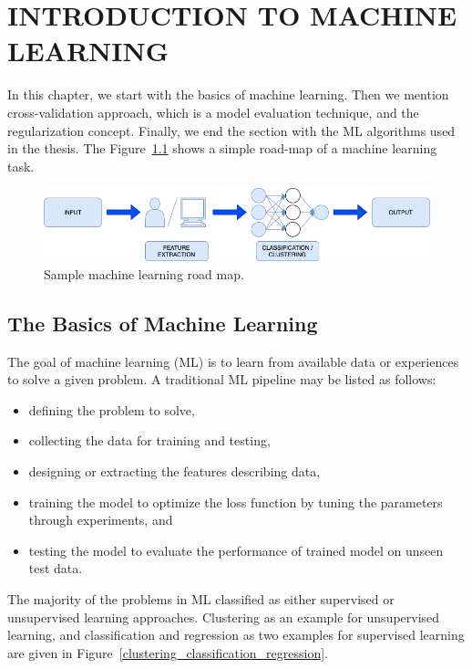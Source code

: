\chapter{INTRODUCTION TO MACHINE LEARNING}
\label{ch:CH4}

In this chapter, we start with the basics of machine learning. Then we mention cross-validation approach, which is a model evaluation technique, and the regularization concept. Finally, we end the section with the ML algorithms used in the thesis. The Figure~\ref{basic_ml} shows a simple road-map of a machine learning task.

\begin{figure}[h]
	\centering
	\includegraphics[width=\linewidth]{fig/basic_ml.png}
	\vspace*{2mm}
	\caption{Sample machine learning road map.}
	\label{basic_ml}
\end{figure}

\section{The Basics of Machine Learning}

The goal of machine learning (ML) is to learn from available data or experiences to solve a given problem. A traditional ML pipeline may be listed as follows:

\begin{itemize}
	\item defining the problem to solve,
	\item collecting the data for training and testing,
	\item designing or extracting the features describing data,
	\item training the model to optimize the loss function by tuning the parameters through experiments, and
	\item testing the model to evaluate the performance of trained model on unseen test data.
\end{itemize}

The majority of the problems in ML classified as either supervised or unsupervised learning approaches. Clustering as an example for unsupervised learning, and classification and regression as two examples for supervised learning are given in Figure~\ref{clustering_classification_regression}.

